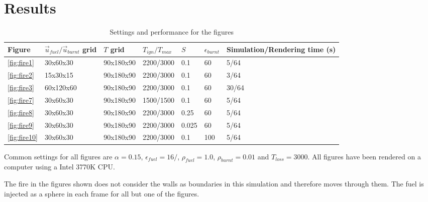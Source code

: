 \section{Results}

\begin{table}[h!]\footnotesize
\caption{Settings and performance for the figures}
\begin{tabular}{lllllll}
\hline
Figure & $\vec{u}_{fuel}/\vec{u}_{burnt}$ grid & $T$ grid & $T_{ign}/T_{max}$ & $S$ & $\epsilon_{burnt}$ & Simulation/Rendering time (s) \\
\hline
\ref{fig:fire1}      &	30x60x30	&	90x180x90	&	2200/3000	&	0.1	&		60	&	5/64	\\
\ref{fig:fire2}      &	15x30x15	&	90x180x90	&	2200/3000	&	0.1	&		60	&	3/64	\\
\ref{fig:fire3}      &	60x120x60	&	90x180x90	&	2200/3000	&	0.1	&		60	&	30/64	\\
\ref{fig:fire7}      &	30x60x30	&	90x180x90	&	1500/1500	&	0.1	&		60	&	5/64	\\
\ref{fig:fire8}      &	30x60x30	&	90x180x90	&	2200/3000	&	0.25	&	60	&	5/64	\\
\ref{fig:fire9}      &	30x60x30	&	90x180x90	&	2200/3000	&	0.025	&	60	&	5/64	\\
\ref{fig:fire10}     &	30x60x30	&	90x180x90	&	2200/3000	&	0.1		&	100	&	5/64	\\
\hline
\end{tabular}
\end{table}

Common settings for all figures are $\alpha = 0.15$, $\epsilon_{fuel} = 16/$,  $\rho_{fuel} = 1.0$, $\rho_{burnt} = 0.01$ and $T_{loss} = 3000$. All figures have been rendered on a computer using a Intel 3770K CPU. 

The fire in the figures shown does not consider the walls as boundaries in this simulation and therefore moves through them. The fuel is injected as a sphere in each frame for all but one of the figures.

